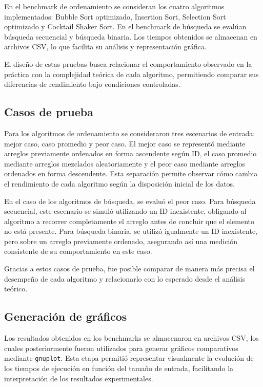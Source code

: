 En el benchmark de ordenamiento se consideran los cuatro algoritmos implementados: Bubble Sort optimizado, Insertion Sort, Selection Sort optimizado y Cocktail Shaker Sort. En el benchmark de búsqueda se evalúan búsqueda secuencial y búsqueda binaria. Los tiempos obtenidos se almacenan en archivos CSV, lo que facilita su análisis y representación gráfica.

El diseño de estas pruebas busca relacionar el comportamiento observado en la práctica con la complejidad teórica de cada algoritmo, permitiendo comparar sus diferencias de rendimiento bajo condiciones controladas.

\subsection{Casos de prueba}
Para los algoritmos de ordenamiento se consideraron tres escenarios de entrada: mejor caso, caso promedio y peor caso. El mejor caso se representó mediante arreglos previamente ordenados en forma ascendente según ID, el caso promedio mediante arreglos mezclados aleatoriamente y el peor caso mediante arreglos ordenados en forma descendente. Esta separación permite observar cómo cambia el rendimiento de cada algoritmo según la disposición inicial de los datos.

En el caso de los algoritmos de búsqueda, se evaluó el peor caso. Para búsqueda secuencial, este escenario se simuló utilizando un ID inexistente, obligando al algoritmo a recorrer completamente el arreglo antes de concluir que el elemento no está presente. Para búsqueda binaria, se utilizó igualmente un ID inexistente, pero sobre un arreglo previamente ordenado, asegurando así una medición consistente de su comportamiento en este caso.

Gracias a estos casos de prueba, fue posible comparar de manera más precisa el desempeño de cada algoritmo y relacionarlo con lo esperado desde el análisis teórico.

\subsection{Generación de gráficos}
Los resultados obtenidos en los benchmarks se almacenaron en archivos CSV, los cuales posteriormente fueron utilizados para generar gráficos comparativos mediante \texttt{gnuplot}. Esta etapa permitió representar visualmente la evolución de los tiempos de ejecución en función del tamaño de entrada, facilitando la interpretación de los resultados experimentales.

